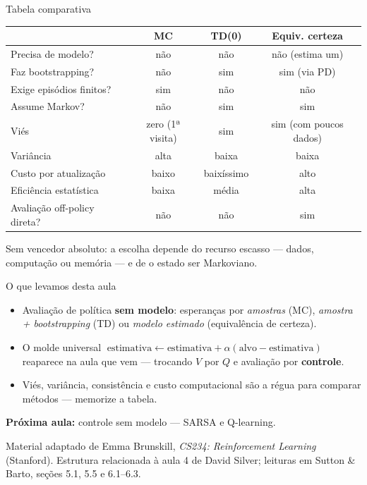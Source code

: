\documentclass[aspectratio=169, 11pt]{beamer}
\begin{document}
\begin{frame}{Tabela comparativa}
  \centering
  \renewcommand{\arraystretch}{1.15}
  {\footnotesize
  \begin{tabular}{lccc}
    & \textbf{MC} & \textbf{TD(0)} & \textbf{Equiv. certeza}\\ \hline
    Precisa de modelo?            & não & não & não (estima um)\\
    Faz bootstrapping?            & não & sim & sim (via PD)\\
    Exige episódios finitos?      & sim & não & não\\
    Assume Markov?                & não & sim & sim\\
    Viés                          & zero (1ª visita) & sim & sim (com poucos dados)\\
    Variância                     & alta & baixa & baixa\\
    Custo por atualização         & baixo & baixíssimo & alto\\
    Eficiência estatística        & baixa & média & alta\\
    Avaliação off-policy direta?  & não & não & sim\\
  \end{tabular}}

  \smallskip
  \begin{alertabox}
    Sem vencedor absoluto: a escolha depende do recurso escasso — dados,
    computação ou memória — e de o estado ser Markoviano.
  \end{alertabox}
\end{frame}

\begin{frame}{O que levamos desta aula}
  \begin{itemize}
    \item Avaliação de política \textbf{sem modelo}: esperanças por
      \emph{amostras} (MC), \emph{amostra + bootstrapping} (TD) ou
      \emph{modelo estimado} (equivalência de certeza).
    \item O molde universal
      $\;\text{estimativa} \leftarrow \text{estimativa}
        + \alpha(\text{alvo} - \text{estimativa})\;$
      reaparece na aula que vem — trocando $V$ por $Q$ e avaliação por
      \textbf{controle}.
    \item Viés, variância, consistência e custo computacional são a régua
      para comparar métodos — memorize a tabela.
  \end{itemize}

  \medskip
  \textbf{Próxima aula:} controle sem modelo — SARSA e Q-learning.

  \medskip
  {\small\color{rlCinza} Material adaptado de Emma Brunskill,
  \emph{CS234: Reinforcement Learning} (Stanford). Estrutura relacionada à
  aula 4 de David Silver; leituras em Sutton \& Barto,
  seções 5.1, 5.5 e 6.1–6.3.}
\end{frame}
\end{document}
